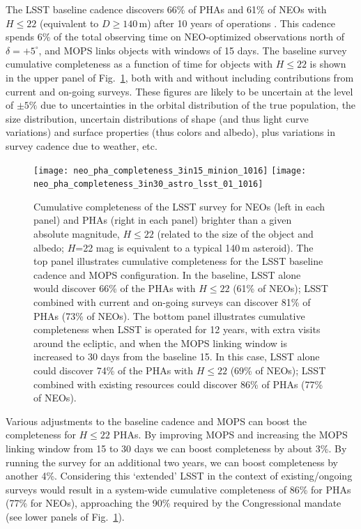 The LSST baseline cadence discovers 66\% of PHAs and 61\% of NEOs with $H\leq22$ (equivalent to $D\ge140$\,m)
after 10 years of operations \citep{2018Icar..303..181J}.  This cadence spends 6\% of the total
observing time on NEO-optimized observations north of $\delta = +5^\circ$, and MOPS links objects with windows of 15 days.
The baseline survey cumulative completeness as a function of time for objects with $H\le22$ is shown in the upper panel of Fig.~\ref{Fig:Cneo},
both with and without including contributions from current and
on-going surveys. These figures are likely to be uncertain at the level of $\pm5\%$ due
to uncertainties in the orbital distribution of the true population, the size distribution, uncertain distributions of shape
(and thus light curve variations) and surface properties (thus colors and albedo), plus variations in survey cadence due to
weather, etc.

\begin{figure}
\texttt{[image: neo\_pha\_completeness\_3in15\_minion\_1016]}
\texttt{[image: neo\_pha\_completeness\_3in30\_astro\_lsst\_01\_1016]}
\caption{Cumulative completeness of the LSST survey for NEOs (left in each panel) and PHAs (right in each panel)
brighter than a given absolute magnitude, $H\le22$ (related to the size of the object and albedo;
$H$=22 mag is equivalent to a typical 140\,m asteroid). The top panel illustrates cumulative completeness
for the LSST baseline cadence and MOPS configuration. In the baseline, LSST alone would discover 66\% of the PHAs
with $H\le22$ (61\% of NEOs); LSST combined with current and on-going
surveys
can discover 81\% of PHAs (73\% of NEOs). The bottom panel illustrates cumulative
completeness when LSST is operated for 12 years, with extra visits around the ecliptic, and when the MOPS linking
window is increased to 30 days from the baseline 15. In this case, LSST alone could discover 74\% of the PHAs with
$H\le22$ (69\% of NEOs); LSST combined with existing resources could discover 86\% of PHAs (77\% of NEOs).
}
\label{Fig:Cneo}
\end{figure}

Various adjustments to the baseline cadence and MOPS can boost the completeness for $H\le22$ PHAs.
By improving MOPS and increasing the MOPS linking window from 15 to 30 days we can boost completeness
by about 3\%. By running the survey for an additional two years, we can boost completeness by another 4\%.
Considering this `extended' LSST in the context of existing/ongoing surveys would result in a system-wide cumulative completeness of 86\% for PHAs (77\% for NEOs), approaching the 90\% required by the Congressional mandate (see
lower panels of Fig.~\ref{Fig:Cneo}).


